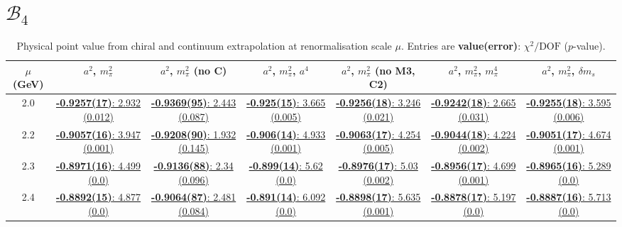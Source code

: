 \documentclass[12pt]{extarticle}
\begin{document}
\section{$\mathcal{B}_4$}
\begin{table}[h!]
\begin{center}
\begin{tabular}{|c|c|c|c|c|c|c|}
\hline
$\mu$ (GeV) & $a^2$, $m_\pi^2$& $a^2$, $m_\pi^2$ (no C)& $a^2$, $m_\pi^2$, $a^4$& $a^2$, $m_\pi^2$ (no M3, C2)& $a^2$, $m_\pi^2$, $m_\pi^4$& $a^2$, $m_\pi^2$, $\delta m_s$\\
\hline
2.0& \hyperlink{SSpPP/NPR/bag_a2m2_20.pdf.1}{\textbf{-0.9257(17)}: 2.932 (0.012)} & \hyperlink{SSpPP/NPR/bag_a2m2noC_20.pdf.1}{\textbf{-0.9369(95)}: 2.443 (0.087)} & \hyperlink{SSpPP/NPR/bag_a2a4m2_20.pdf.1}{\textbf{-0.925(15)}: 3.665 (0.005)} & \hyperlink{SSpPP/NPR/bag_a2m2mcut_20.pdf.1}{\textbf{-0.9256(18)}: 3.246 (0.021)} & \hyperlink{SSpPP/NPR/bag_a2m2m4_20.pdf.1}{\textbf{-0.9242(18)}: 2.665 (0.031)} & \hyperlink{SSpPP/NPR/bag_a2m2delm_20.pdf.1}{\textbf{-0.9255(18)}: 3.595 (0.006)}\\
2.2& \hyperlink{SSpPP/NPR/bag_a2m2_22.pdf.1}{\textbf{-0.9057(16)}: 3.947 (0.001)} & \hyperlink{SSpPP/NPR/bag_a2m2noC_22.pdf.1}{\textbf{-0.9208(90)}: 1.932 (0.145)} & \hyperlink{SSpPP/NPR/bag_a2a4m2_22.pdf.1}{\textbf{-0.906(14)}: 4.933 (0.001)} & \hyperlink{SSpPP/NPR/bag_a2m2mcut_22.pdf.1}{\textbf{-0.9063(17)}: 4.254 (0.005)} & \hyperlink{SSpPP/NPR/bag_a2m2m4_22.pdf.1}{\textbf{-0.9044(18)}: 4.224 (0.002)} & \hyperlink{SSpPP/NPR/bag_a2m2delm_22.pdf.1}{\textbf{-0.9051(17)}: 4.674 (0.001)}\\
2.3& \hyperlink{SSpPP/NPR/bag_a2m2_23.pdf.1}{\textbf{-0.8971(16)}: 4.499 (0.0)} & \hyperlink{SSpPP/NPR/bag_a2m2noC_23.pdf.1}{\textbf{-0.9136(88)}: 2.34 (0.096)} & \hyperlink{SSpPP/NPR/bag_a2a4m2_23.pdf.1}{\textbf{-0.899(14)}: 5.62 (0.0)} & \hyperlink{SSpPP/NPR/bag_a2m2mcut_23.pdf.1}{\textbf{-0.8976(17)}: 5.03 (0.002)} & \hyperlink{SSpPP/NPR/bag_a2m2m4_23.pdf.1}{\textbf{-0.8956(17)}: 4.699 (0.001)} & \hyperlink{SSpPP/NPR/bag_a2m2delm_23.pdf.1}{\textbf{-0.8965(16)}: 5.289 (0.0)}\\
2.4& \hyperlink{SSpPP/NPR/bag_a2m2_24.pdf.1}{\textbf{-0.8892(15)}: 4.877 (0.0)} & \hyperlink{SSpPP/NPR/bag_a2m2noC_24.pdf.1}{\textbf{-0.9064(87)}: 2.481 (0.084)} & \hyperlink{SSpPP/NPR/bag_a2a4m2_24.pdf.1}{\textbf{-0.891(14)}: 6.092 (0.0)} & \hyperlink{SSpPP/NPR/bag_a2m2mcut_24.pdf.1}{\textbf{-0.8898(17)}: 5.635 (0.001)} & \hyperlink{SSpPP/NPR/bag_a2m2m4_24.pdf.1}{\textbf{-0.8878(17)}: 5.197 (0.0)} & \hyperlink{SSpPP/NPR/bag_a2m2delm_24.pdf.1}{\textbf{-0.8887(16)}: 5.713 (0.0)}\\
\hline
\end{tabular}
\caption{Physical point value from chiral and continuum extrapolation at renormalisation scale $\mu$. Entries are \textbf{value(error)}: $\chi^2/\text{DOF}$ ($p$-value).}
\end{center}
\end{table}
\end{document}
